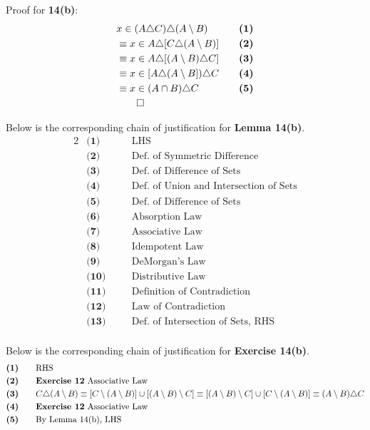 Proof for \textbf{14(b)}:
\begin{alignat*}{2}
&x \in (A \triangle C) \triangle (A \setminus B) && \quad \textbf{(1)}\\
&\equiv x \in A \triangle [C \triangle (A \setminus B)] && \quad \textbf{(2)}\\
&\equiv x \in A \triangle [(A \setminus B) \triangle C] && \quad \textbf{(3)}\\
&\equiv x \in [A \triangle (A \setminus B]) \triangle C && \quad \textbf{(4)}\\
&\equiv x \in (A \cap B) \triangle C && \quad \textbf{(5)}\\
&\qed
\end{alignat*}
\pagebreak

Below is the corresponding chain of justification for \textbf{Lemma 14(b)}.
\begin{alignat*}{2}
&\textbf{(1)} && \quad \text{LHS}\\
&\textbf{(2)} && \quad \text{Def. of Symmetric Difference}\\
&\textbf{(3)} && \quad \text{Def. of Difference  of Sets}\\
&\textbf{(4)} && \quad \text{Def. of Union and Intersection of Sets}\\
&\textbf{(5)} && \quad \text{Def. of Difference  of Sets}\\
&\textbf{(6)} && \quad \text{Absorption Law}\\
&\textbf{(7)} && \quad \text{Associative Law}\\
&\textbf{(8)} && \quad \text{Idempotent Law}\\
&\textbf{(9)} && \quad \text{DeMorgan's Law}\\
&\textbf{(10)} && \quad \text{Distributive Law}\\
&\textbf{(11)} && \quad \text{Definition of Contradiction}\\
&\textbf{(12)} && \quad \text{Law of Contradiction}\\
&\textbf{(13)} && \quad \text{Def. of Intersection of Sets, RHS}\\
\end{alignat*}

Below is the corresponding chain of justification for \textbf{Exercise 14(b)}.
\begin{alignat*}{2}
&\textbf{(1)} && \quad \text{RHS}\\
&\textbf{(2)} && \quad \text{\textbf{Exercise 12} Associative Law}\\
&\textbf{(3)} && \quad C \triangle (A \setminus B) \equiv [C \setminus (A \setminus B)] \cup [(A \setminus B) \setminus C] \equiv [(A \setminus B) \setminus C] \cup [C \setminus (A \setminus B)] \equiv (A \setminus B) \triangle C\\
&\textbf{(4)} && \quad \text{\textbf{Exercise 12} Associative Law}\\
&\textbf{(5)} && \quad \text{By Lemma 14(b), LHS}\\
\end{alignat*}
\pagebreak

